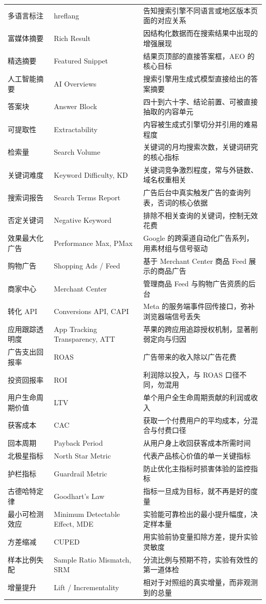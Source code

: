 \begin{xltabular}{\textwidth}{L{3.0cm} L{3.6cm} Y}
多语言标注 & hreflang & 告知搜索引擎不同语言或地区版本页面的对应关系 \\
富媒体摘要 & Rich Result & 因结构化数据而在搜索结果中出现的增强展现 \\
精选摘要 & Featured Snippet & 结果页顶部的直接答案框，AEO 的核心目标 \\
人工智能摘要 & AI Overviews & 搜索引擎用生成式模型直接给出的答案摘要 \\
答案块 & Answer Block & 四十到六十字、结论前置、可被直接抽取的内容单元 \\
可提取性 & Extractability & 内容被生成式引擎切分并引用的难易程度 \\
检索量 & Search Volume & 关键词的月均搜索次数，关键词研究的核心指标 \\
关键词难度 & Keyword Difficulty, KD & 关键词竞争激烈程度，常与外链数、域名权重相关 \\
搜索词报告 & Search Terms Report & 广告后台中真实触发广告的查询列表，否词的核心依据 \\
否定关键词 & Negative Keyword & 排除不相关查询的关键词，控制无效花费 \\
效果最大化广告 & Performance Max, PMax & Google 的跨渠道自动化广告系列，用素材组与信号驱动 \\
购物广告 & Shopping Ads / Feed & 基于 Merchant Center 商品 Feed 展示的商品广告 \\
商家中心 & Merchant Center & 管理商品 Feed 与购物广告资质的后台 \\
转化 API & Conversions API, CAPI & Meta 的服务端事件回传接口，弥补浏览器端信号丢失 \\
应用跟踪透明度 & App Tracking Transparency, ATT & 苹果的跨应用追踪授权机制，显著削弱定向与归因 \\
广告支出回报率 & ROAS & 广告带来的收入除以广告花费 \\
投资回报率 & ROI & 利润除以投入，与 ROAS 口径不同，勿混用 \\
用户生命周期价值 & LTV & 单个用户全生命周期贡献的利润或收入 \\
获客成本 & CAC & 获取一个付费用户的平均成本，分混合与付费口径 \\
回本周期 & Payback Period & 从用户身上收回获客成本所需时间 \\
北极星指标 & North Star Metric & 代表产品核心价值的单一关键指标 \\
护栏指标 & Guardrail Metric & 防止优化主指标时损害体验的监控指标 \\
古德哈特定律 & Goodhart's Law & 指标一旦成为目标，就不再是好的度量 \\
最小可检测效应 & Minimum Detectable Effect, MDE & 实验能可靠检出的最小提升幅度，决定样本量 \\
方差缩减 & CUPED & 用实验前协变量扣除方差，提升实验灵敏度 \\
样本比例失配 & Sample Ratio Mismatch, SRM & 分流比例与预期不符，实验有效性的第一道体检 \\
增量提升 & Lift / Incrementality & 相对于对照组的真实增量，而非观测到的总量 \\
\end{xltabular}

